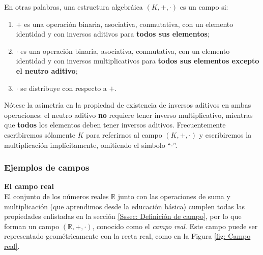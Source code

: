 \documentclass[apuntes]{subfiles}
\begin{document}
\begin{Obs}\label{obs:1.3}

 En otras palabras, una estructura algebráica $(K,+,\cdot)$ es un campo si:
 \begin{enumerate}[label=(\alph*)]
    \item $+$ es una operación binaria, asociativa, conmutativa, con un elemento identidad y con inversos aditivos para \textbf{todos sus elementos};

    \item $\cdot$ es una operación binaria, asociativa, conmutativa, con un elemento identidad y con inversos multiplicativos para \textbf{todos sus elementos excepto el neutro aditivo};

    \item $\cdot$ se distribuye con respecto a $+$.
\end{enumerate}

\noindent Nótese la asimetría en la propiedad de existencia de inversos aditivos en ambas operaciones: el neutro aditivo \textbf{no} requiere tener inverso multiplicativo, mientras que \textbf{todos} los elementos deben tener inversos aditivos. Frecuentemente escribiremos sólamente $K$ para referirnos al campo $(K,+,\cdot)$ y escribiremos la multiplicación implícitamente, omitiendo el símbolo ``$\cdot$''.
\end{Obs}


\subsubsection*{Ejemplos de campos} \label{Sssec: Ejemplos de campos}

\textbf{El campo real} \\

El conjunto de los números reales $\mathbb{R}$ junto con las operaciones de suma y multiplicación (que aprendimos desde la educación básica) cumplen todas las propiedades enlistadas en la sección \ref{Sssec: Definición de campo}, por lo que forman un campo $(\mathbb{R},+,\cdot)$, conocido como el \emph{campo real}. Este campo puede ser representado geométricamente con la recta real, como en la Figura \ref{fig: Campo real}. \\
\end{document}
